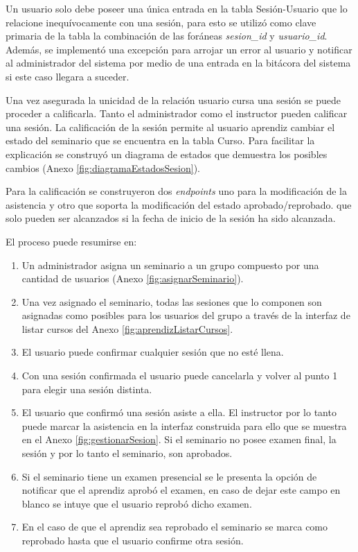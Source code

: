 	Un usuario solo debe poseer una única entrada en la tabla Sesión-Usuario que lo relacione inequívocamente con una sesión, para esto se utilizó como clave primaria de la tabla la combinación de las foráneas \emph{sesion\_id} y \emph{usuario\_id}. Además, se implementó una excepción para arrojar un error al usuario y notificar al administrador del sistema por medio de una entrada en la bitácora del sistema si este caso llegara a suceder.

	Una vez asegurada la unicidad de la relación usuario cursa una sesión se puede proceder a calificarla. Tanto el administrador como el instructor pueden calificar una sesión. La calificación de la sesión permite al usuario aprendiz cambiar el estado del seminario que se encuentra en la tabla Curso. Para facilitar la explicación se construyó un diagrama de estados que demuestra los posibles cambios (Anexo \ref{fig:diagramaEstadosSesion}). 

	Para la calificación se construyeron dos \emph{endpoints} uno para la modificación de la asistencia y otro que soporta la modificación del estado aprobado/reprobado. que solo pueden ser alcanzados si la fecha de inicio de la sesión ha sido alcanzada.

	El proceso puede resumirse en:

	\begin{enumerate}
		\item Un administrador asigna un seminario a un grupo compuesto por una cantidad de usuarios (Anexo \ref{fig:asignarSeminario}). 
		
		\item Una vez asignado el seminario, todas las sesiones que lo componen son asignadas como posibles para los usuarios del grupo a través de la interfaz de listar cursos del Anexo \ref{fig:aprendizListarCursos}.

		\item El usuario puede confirmar cualquier sesión que no esté llena.

		\item Con una sesión confirmada el usuario puede cancelarla y volver al punto 1 para elegir una sesión distinta.

		\item El usuario que confirmó una sesión asiste a ella. El instructor por lo tanto puede marcar la asistencia en la interfaz construida para ello que se muestra en el Anexo \ref{fig:gestionarSesion}. Si el seminario no posee examen final, la sesión y por lo tanto el seminario, son aprobados.

		\item Si el seminario tiene un examen presencial se le presenta la opción de notificar que el aprendiz aprobó el examen, en caso de dejar este campo en blanco se intuye que el usuario reprobó dicho examen.

		\item En el caso de que el aprendiz sea reprobado el seminario se marca como reprobado hasta que el usuario confirme otra sesión.

	\end{enumerate}

